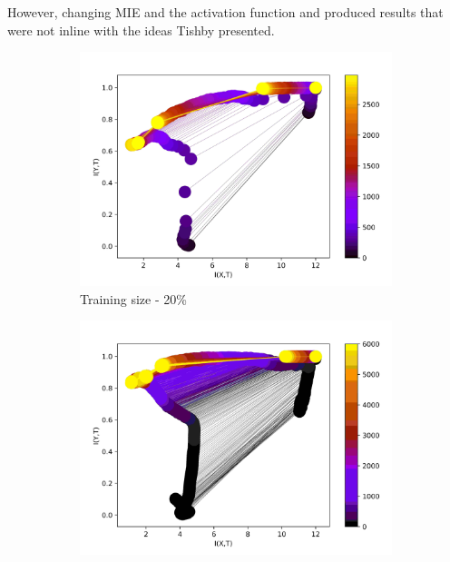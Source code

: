 \documentclass[dissertation.tex]{subfiles}
\begin{document}
However, changing MIE and the activation function and produced results that were
not inline with the ideas Tishby presented.

\begin{figure}[ht]
  \centering
  \begin{subfigure}[t]{0.32\textwidth}
    \centering
    \includegraphics[width=\textwidth]{figs/eval/trainingSize/Binning20.jpg}
    \caption{
      Training size - 20\%
    }
    \label{figBinningTS20}
  \end{subfigure}
  \begin{subfigure}[t]{0.32\textwidth}
    \centering
    \includegraphics[width=\textwidth]{figs/eval/trainingSize/Binning40.jpg}
    \caption{
}
\end{subfigure}
\end{figure}
\end{document}
